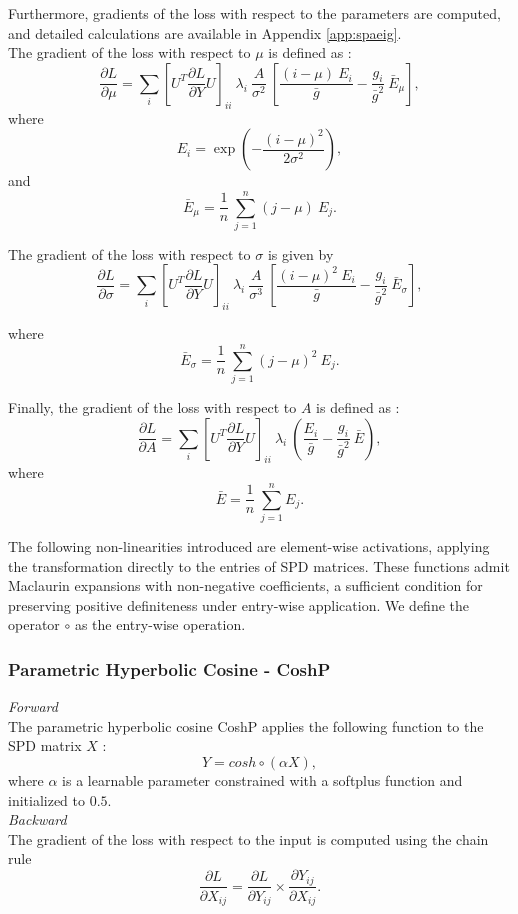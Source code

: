 \documentclass[11pt,a4paper]{article}
\begin{document}
\noindent Furthermore, gradients of the loss with respect to the parameters are computed, and detailed calculations are available in Appendix \ref{app:spaeig}. \\
The gradient of the loss with respect to $\mu$ is defined as :
\[ \frac{\partial L}{\partial \mu} = \sum_i \left[ U^T \frac{\partial L}{\partial Y} U\right]_{ii} \: \lambda_i \: \frac{A}{\sigma^2} \: \left[ \frac{(i-\mu)\: E_i}{\bar{g}} - \frac{g_i}{\bar{g}^2} \: \bar{E}_{\mu} \right] ,\]
 where \[ E_i = \exp(-\frac{(i-\mu)^2}{2\sigma^2}),\] and  \[\bar{E}_{\mu} = \frac{1}{n} \: \sum_{j=1}^{n} (j-\mu) \: E_j .\]

\noindent The gradient of the loss with respect to $\sigma$ is given by 
\[ \frac{\partial L}{\partial \sigma} = \sum_i \left[ U^T \frac{\partial L}{\partial Y} U\right]_{ii} \: \lambda_i \: \frac{A}{\sigma^3} \: \left[ \frac{(i-\mu)^2\: E_i}{\bar{g}} - \frac{g_i}{\bar{g}^2} \: \bar{E}_{\sigma} \right], \]
 
\noindent where \[\bar{E}_{\sigma} = \frac{1}{n} \: \sum_{j=1}^{n} (j-\mu)^2 \: E_j .\]

\noindent Finally, the gradient of the loss with respect to $A$ is defined as :
\[\frac{\partial L}{\partial A} = \sum_{i} \left[ U^T \frac{\partial L}{\partial Y} U \right]_{ii}  \: \lambda_i \: (\frac{E_i}{\bar{g}} - \frac{g_i}{\bar{g}^2} \: \bar{E}), \]
where  \[\bar{E} = \frac{1}{n} \: \sum_{j=1}^{n} E_j .\]

The following non-linearities introduced are element-wise activations, applying the transformation directly to the entries of SPD matrices. These functions admit Maclaurin expansions with non-negative coefficients, a sufficient condition for preserving positive definiteness under entry-wise application. We define the operator $\circ$ as the entry-wise operation.

\subsubsection{Parametric Hyperbolic Cosine - CoshP}
\noindent \textit{Forward} \\
The parametric hyperbolic cosine CoshP applies the following function to the SPD matrix $X$ : \[ Y = cosh \circ (\alpha X), \] where $\alpha$ is a learnable parameter  constrained with a softplus function and initialized to $0.5$. \\

\noindent \textit{Backward} \\
The gradient of the loss with respect to the input is computed using the chain rule \[ \frac{\partial L}{ \partial X_{ij}} = \frac{\partial L}{\partial Y_{ij}} \times \frac{\partial Y_{ij}}{\partial X_{ij}}.\]
\end{document}
